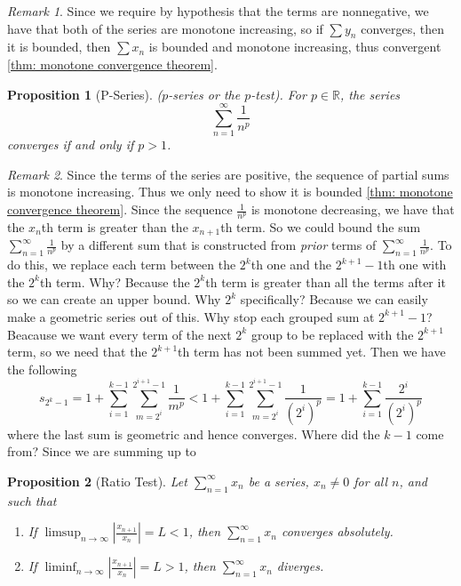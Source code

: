 \documentclass{article}
\newtheorem{proposition}{Proposition}[section]
\theoremstyle{definition}
\theoremstyle{remark}
\newtheorem{remark}{Remark}[section]
\begin{document}
\begin{remark}
Since we require by hypothesis that the terms are nonnegative, 
we have that both of the series are monotone increasing, so if $\sum{y_n}$ 
converges, then it is bounded, then $\sum{x_n}$ is bounded and monotone increasing, thus convergent \ref{thm: monotone convergence theorem}.
\end{remark}




\begin{proposition}[P-Series]\label{prp:p-series}
($p$-series or the $p$-test). For $p \in \mathbb{R}$, the series
\[
\sum_{n=1}^{\infty} \frac{1}{n^p}
\]
\textit{converges if and only if} $p > 1$.

\end{proposition}

\begin{remark}
Since the terms of the series are positive, the sequence of partial sums 
is monotone increasing. Thus we only need to show it is bounded \ref{thm: monotone convergence theorem}.
Since the sequence $\frac{1}{n^p}$ is monotone decreasing, we have that the $x_n$th term
is greater than the $x_{n+1}$th term. So we could bound the sum $\sum_{n=1}^{\infty} \frac{1}{n^p}$ 
by a different sum that is constructed from \textit{prior} terms of $\sum_{n=1}^{\infty} \frac{1}{n^p}$.
To do this, we replace each term between the $2^k$th one and the $2^{k+1}-1$th one with the $2^k$th term. 
Why? Because the $2^k$th term is greater than all the terms after it so we can create an 
upper bound. Why $2^k$ specifically? Because we can easily make a geometric series out of this. 
Why stop each grouped sum at $2^{k+1}-1$? Beacause we want every term of the next $2^k$ group to 
be replaced with the $2^{k+1}$ term, so we need that the $2^{k+1}$th term has not been summed yet. 
Then we have the following \[
s_{2^k -1} = 1+\sum_{i=1}^{k-1}\sum_{m=2^i}^{2^{i+1}-1}{\frac{1}{m^p}} 
< 1+ \sum_{i=1}^{k-1}\sum_{m=2^i}^{2^{i+1}-1}\frac{1}{(2^i)^p}
= 1 + \sum_{i=1}^{k-1}\frac{2^i}{(2^i)^p}
\]
where the last sum is geometric and hence converges. Where did the $k-1$ come from? Since we 
are summing up to 
\end{remark}







\begin{proposition}[Ratio Test]\label{prp:ratio_test_Series}
Let $\sum_{n=1}^{\infty} x_n$ be a series, $x_n \neq 0$ for all $n$, and such that
\begin{enumerate}
\item If $\limsup_{n \to \infty} \left| \frac{x_{n+1}}{x_n} \right|  = L < 1$, then $\sum_{n=1}^{\infty} x_n$ \textit{converges absolutely}.
\item If $\liminf_{n \to \infty} \left| \frac{x_{n+1}}{x_n} \right|  = L > 1$, then $\sum_{n=1}^{\infty} x_n$ \textit{diverges}.
\end{enumerate}
\end{proposition}
\end{document}
